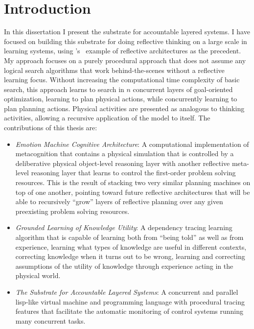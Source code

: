 \chapter{Introduction}
\label{chapter:introduction}

In this dissertation I present the substrate for accountable layered
systems.  I have focused on building this substrate for doing
reflective thinking on a large scale in learning systems, using
{\mbox{\citeauthor{singh:2005b}'s~\citeyearpar{singh:2005b}}} example
of reflective architectures as the precedent.  My approach focuses on
a purely procedural approach that does not assume any logical search
algorithms that work behind-the-scenes without a reflective learning
focus.  Without increasing the computational time complexity of basic
search, this approach learns to search in $n$ concurrent layers of
goal-oriented optimization, learning to plan physical actions, while
concurrently learning to plan planning actions.  Physical activities
are presented as analogous to thinking activities, allowing a
recursive application of the model to itself.  The contributions of
this thesis are:

\begin{itemize}
\item \emph{Emotion Machine Cognitive Architecture}: A computational
  implementation of metacognition that contains a physical simulation
  that is controlled by a deliberative physical object-level reasoning
  layer with another reflective meta-level reasoning layer that learns
  to control the first-order problem solving resources.  This is the
  result of stacking two very similar planning machines on top of one
  another, pointing toward future reflective architectures that will
  be able to recursively ``grow'' layers of reflective planning over
  any given preexisting problem solving resources.
\item \emph{Grounded Learning of Knowledge Utility}: A dependency
  tracing learning algorithm that is capable of learning both from
  ``being told'' as well as from experience, learning what types of
  knowledge are useful in different contexts, correcting knowledge
  when it turns out to be wrong, learning and correcting assumptions
  of the utility of knowledge through experience acting in the
  physical world.
\item \emph{The Substrate for Accountable Layered Systems}: A
  concurrent and parallel lisp-like virtual machine and programming
  language with procedural tracing features that facilitate the
  automatic monitoring of control systems running many concurrent
  tasks.
\end{itemize}

